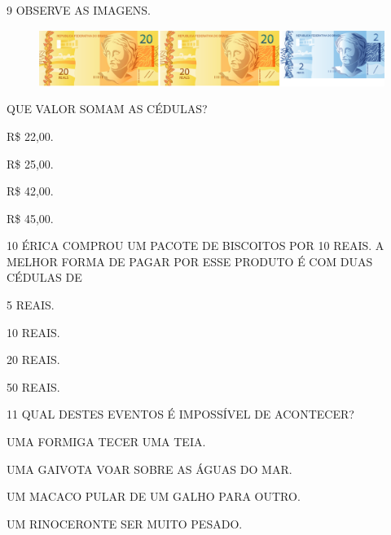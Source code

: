\num{9} OBSERVE AS IMAGENS.


\begin{figure}[H]
\centering
\includegraphics[width=\textwidth]{./media/SAEB_1ANO_MAT_FIGURA117b.png}
\end{figure}

QUE VALOR SOMAM AS CÉDULAS?

\begin{escolha}
\item R\$ 22,00.

\item R\$ 25,00.

\item R\$ 42,00.

\item R\$ 45,00.
\end{escolha}

\pagebreak
\num{10} ÉRICA COMPROU UM PACOTE DE BISCOITOS POR 10 REAIS. A MELHOR
FORMA DE PAGAR POR ESSE PRODUTO É COM DUAS CÉDULAS DE

\begin{escolha}
\item 5 REAIS.

\item 10 REAIS.

\item 20 REAIS.

\item 50 REAIS.
\end{escolha}

\vspace{1cm}

\num{11} QUAL DESTES EVENTOS É IMPOSSÍVEL DE ACONTECER?

\begin{escolha}
\item UMA FORMIGA TECER UMA TEIA.

\item UMA GAIVOTA VOAR SOBRE AS ÁGUAS DO MAR.

\item UM MACACO PULAR DE UM GALHO PARA OUTRO.

\item UM RINOCERONTE SER MUITO PESADO.
\end{escolha}

